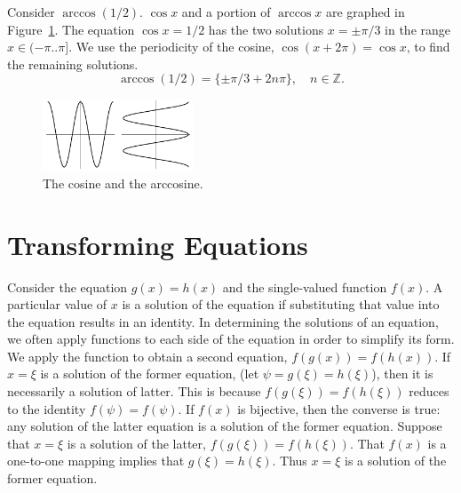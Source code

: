 \begin{Example}
Consider $\arccos(1/2)$.  $\cos x$ and a portion of $\arccos x$ are 
graphed in Figure~\ref{yecxyeax}.
The equation $\cos x = 1/2$ has the two solutions $x = \pm \pi / 3$ in the range
$x \in (-\pi..\pi]$.  We use the periodicity of the cosine, 
$\cos(x + 2 \pi) = \cos x$, to find the remaining solutions.
\[
\arccos(1/2) = \{ \pm \pi / 3 + 2 n \pi \}, \quad n \in \mathbb{Z}.
\]

\begin{figure}[h!]
\begin{center}
\includegraphics[width=0.4\textwidth]{algebra/sets/yecxyeax}
\end{center}
\caption{The cosine and the arccosine.}
\label{yecxyeax}
\end{figure}
\end{Example}











\section{Transforming Equations}

Consider the equation $g(x) = h(x)$ and the single-valued function $f(x)$.
A particular value of $x$
is a solution of the equation if substituting that value into the equation
results in an identity.  In determining the solutions of an equation, we 
often apply functions to each side of the equation in order to simplify
its form.  
We apply the function to obtain a second equation, $f(g(x)) = f(h(x))$.
If $x = \xi$ is a solution of the former equation, (let $\psi = g(\xi) = h(\xi)$), 
then it is necessarily a solution of latter.  This is because
$f(g(\xi)) = f(h(\xi))$ reduces to the identity $f(\psi) = f(\psi)$.
If $f(x)$ is bijective, then the converse is true: any solution of the 
latter equation is a solution of the former equation.  Suppose that
$x = \xi$ is a solution of the latter, $f(g(\xi)) = f(h(\xi))$.  That
$f(x)$ is a one-to-one mapping implies that $g(\xi) = h(\xi)$.  Thus $x = \xi$
is a solution of the former equation.

